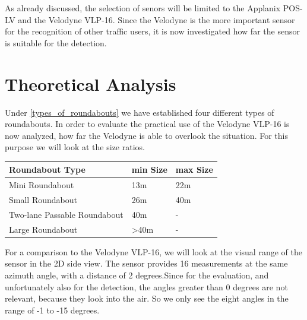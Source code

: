 \documentclass[11pt,oneside,openright]{mpreport}
\begin{document}
As already discussed, the selection of senors will be limited to the Applanix POS-LV and the Velodyne VLP-16. Since the Velodyne is the more
important sensor for the recognition of other traffic users, it is now investigated how far the sensor is suitable for the detection.

\section{Theoretical Analysis}

Under \cref{types_of_roundabouts} we have established four different types of roundabouts. In order to evaluate the practical use of the Velodyne VLP-16 is now analyzed,
how far the Velodyne is able to overlook the situation. For this purpose we will look at the size ratios.


\begin{tabularx}{\textwidth}{|X|X|X|}
\hline \textbf{Roundabout Type} & \textbf{min Size} & \textbf{max Size} \\\hline
Mini Roundabout& 13m & 22m \\\hline
Small Roundabout& 26m  & 40m \\\hline
Two-lane Passable Roundabout& 40m & - \\\hline
Large Roundabout& >40m &  - \\\hline
\end{tabularx}


For a comparison to the Velodyne VLP-16, we will look at the visual range of the sensor in the 2D side view. The sensor provides 16 measurements at the same azimuth angle,
with a distance of 2 degrees.Since for the evaluation, and unfortunately also for the detection, the angles greater than 0 degrees are not relevant, because they look into
the air. So we only see the eight angles in the range of -1 to -15 degrees.
\end{document}
